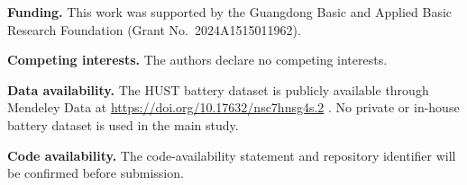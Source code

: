 \documentclass[pdflatex,sn-mathphys-num]{sn-jnl}
\begin{document}
\noindent\textbf{Funding.}
This work was supported by the Guangdong Basic and Applied Basic Research Foundation (Grant No.~2024A1515011962).

\noindent\textbf{Competing interests.}
The authors declare no competing interests.

\noindent\textbf{Data availability.}
The HUST battery dataset is publicly available through Mendeley Data at \url{https://doi.org/10.17632/nsc7hnsg4s.2} \cite{Yuan2022HUSTDataset}. No private or in-house battery dataset is used in the main study.

\noindent\textbf{Code availability.}
The code-availability statement and repository identifier will be confirmed before submission.


\end{document}

